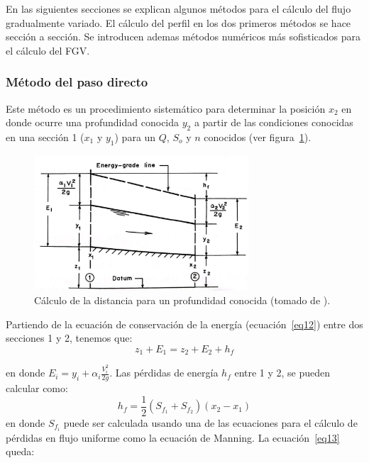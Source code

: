 \documentclass[11pt, oneside]{article}
\begin{document}

En las siguientes secciones se explican algunos m\'etodos para el c\'alculo del flujo gradualmente variado. El c\'alculo del perfil en los dos primeros m\'etodos se hace secci\'on a secci\'on. Se introducen ademas m\'etodos num\'ericos m\'as sofisticados para el c\'alculo del FGV.  

\subsubsection{M\'etodo del paso directo}
Este m\'etodo es un procedimiento sistem\'atico para determinar la posici\'on $x_2$ en donde ocurre una profundidad conocida $y_2$ a partir de las condiciones conocidas en una secci\'on 1 ($x_1$ y $y_1$) para un $Q$, $S_o$ y $n$ conocidos (ver figura~\ref{fig8}).
\begin{figure}[h]
\centering
\includegraphics[width=8cm]{fig62.jpeg}
\caption{C\'alculo de la distancia para un profundidad conocida (tomado de \cite{Chau}).}
\label{fig8}
\end{figure}

Partiendo de la ecuaci\'on de conservaci\'on de la energ\'ia (ecuaci\'on~\ref{eq12}) entre dos secciones 1 y 2, tenemos que:
\begin{equation}
    z_1 + E_1 = z_2 + E_2  + h_f
\label{eq13}
\end{equation}

en donde $E_i = y_i + \alpha_i \frac{V_i^2}{2g}$. Las p\'erdidas de energ\'ia $h_f$ entre 1 y 2, se pueden calcular como:
$$
h_f = \frac{1}{2}\left( S_{f_1} + S_{f_2} \right)  (x_2 - x_1)
$$
en donde $S_{f_i}$ puede ser calculada usando una de las ecuaciones para el c\'alculo de p\'erdidas en flujo uniforme como la ecuaci\'on de Manning. La ecuaci\'on~\ref{eq13} queda:
\end{document}
